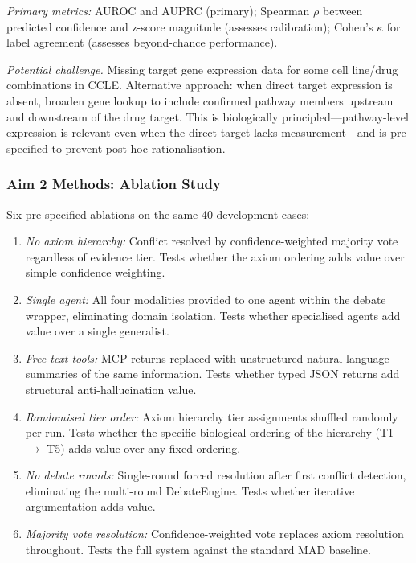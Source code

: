 \documentclass[11pt,letterpaper]{article}
\begin{document}
\textit{Primary metrics:} AUROC and AUPRC (primary); Spearman $\rho$ between predicted
confidence and z-score magnitude (assesses calibration); Cohen's $\kappa$ for label agreement
(assesses beyond-chance performance).

\textit{Potential challenge.} Missing target gene expression data for some cell line/drug
combinations in CCLE. Alternative approach: when direct target expression is absent, broaden
gene lookup to include confirmed pathway members upstream and downstream of the drug target.
This is biologically principled---pathway-level expression is relevant even when the direct target
lacks measurement---and is pre-specified to prevent post-hoc rationalisation.

\subsubsection{Aim 2 Methods: Ablation Study}

Six pre-specified ablations on the same 40 development cases:

\begin{enumerate}
\item \textit{No axiom hierarchy:} Conflict resolved by confidence-weighted majority vote
regardless of evidence tier. Tests whether the axiom ordering adds value over simple confidence
weighting.

\item \textit{Single agent:} All four modalities provided to one agent within the debate wrapper,
eliminating domain isolation. Tests whether specialised agents add value over a single generalist.

\item \textit{Free-text tools:} MCP returns replaced with unstructured natural language
summaries of the same information. Tests whether typed JSON returns add structural anti-hallucination
value.

\item \textit{Randomised tier order:} Axiom hierarchy tier assignments shuffled randomly per
run. Tests whether the specific biological ordering of the hierarchy (T1 $\to$ T5) adds value
over any fixed ordering.

\item \textit{No debate rounds:} Single-round forced resolution after first conflict detection,
eliminating the multi-round DebateEngine. Tests whether iterative argumentation adds value.

\item \textit{Majority vote resolution:} Confidence-weighted vote replaces axiom resolution
throughout. Tests the full system against the standard MAD baseline.
\end{enumerate}
\end{document}
